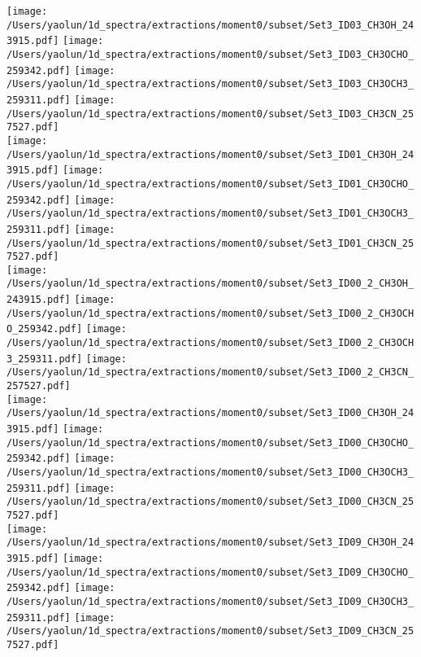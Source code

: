 \addtocounter{figure}{-1}
\begin{figure*}[htbp!]
  \centering
  \texttt{[image: /Users/yaolun/1d\_spectra/extractions/moment0/subset/Set3\_ID03\_CH3OH\_243915.pdf]}
  \texttt{[image: /Users/yaolun/1d\_spectra/extractions/moment0/subset/Set3\_ID03\_CH3OCHO\_259342.pdf]}
  \texttt{[image: /Users/yaolun/1d\_spectra/extractions/moment0/subset/Set3\_ID03\_CH3OCH3\_259311.pdf]}
  \texttt{[image: /Users/yaolun/1d\_spectra/extractions/moment0/subset/Set3\_ID03\_CH3CN\_257527.pdf]}
  \\
  \texttt{[image: /Users/yaolun/1d\_spectra/extractions/moment0/subset/Set3\_ID01\_CH3OH\_243915.pdf]}
  \texttt{[image: /Users/yaolun/1d\_spectra/extractions/moment0/subset/Set3\_ID01\_CH3OCHO\_259342.pdf]}
  \texttt{[image: /Users/yaolun/1d\_spectra/extractions/moment0/subset/Set3\_ID01\_CH3OCH3\_259311.pdf]}
  \texttt{[image: /Users/yaolun/1d\_spectra/extractions/moment0/subset/Set3\_ID01\_CH3CN\_257527.pdf]}
  \\
  \texttt{[image: /Users/yaolun/1d\_spectra/extractions/moment0/subset/Set3\_ID00\_2\_CH3OH\_243915.pdf]}
  \texttt{[image: /Users/yaolun/1d\_spectra/extractions/moment0/subset/Set3\_ID00\_2\_CH3OCHO\_259342.pdf]}
  \texttt{[image: /Users/yaolun/1d\_spectra/extractions/moment0/subset/Set3\_ID00\_2\_CH3OCH3\_259311.pdf]}
  \texttt{[image: /Users/yaolun/1d\_spectra/extractions/moment0/subset/Set3\_ID00\_2\_CH3CN\_257527.pdf]}
  \\
  \texttt{[image: /Users/yaolun/1d\_spectra/extractions/moment0/subset/Set3\_ID00\_CH3OH\_243915.pdf]}
  \texttt{[image: /Users/yaolun/1d\_spectra/extractions/moment0/subset/Set3\_ID00\_CH3OCHO\_259342.pdf]}
  \texttt{[image: /Users/yaolun/1d\_spectra/extractions/moment0/subset/Set3\_ID00\_CH3OCH3\_259311.pdf]}
  \texttt{[image: /Users/yaolun/1d\_spectra/extractions/moment0/subset/Set3\_ID00\_CH3CN\_257527.pdf]}
  \\
  \texttt{[image: /Users/yaolun/1d\_spectra/extractions/moment0/subset/Set3\_ID09\_CH3OH\_243915.pdf]}
  \texttt{[image: /Users/yaolun/1d\_spectra/extractions/moment0/subset/Set3\_ID09\_CH3OCHO\_259342.pdf]}
  \texttt{[image: /Users/yaolun/1d\_spectra/extractions/moment0/subset/Set3\_ID09\_CH3OCH3\_259311.pdf]}
  \texttt{[image: /Users/yaolun/1d\_spectra/extractions/moment0/subset/Set3\_ID09\_CH3CN\_257527.pdf]}
  \\
  \caption{}
\end{figure*}
